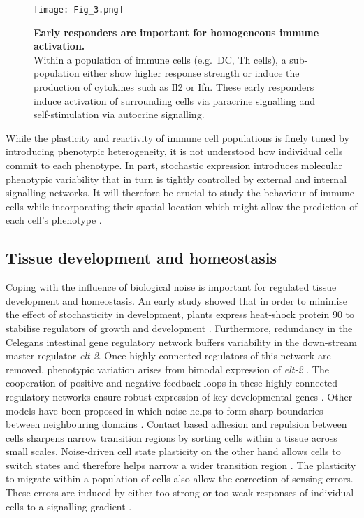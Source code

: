 \begin{figure}[!h]
\centering
\texttt{[image: Fig\_3.png]}
\caption[Early responders are important for homogeneous immune activation]{\textbf{Early responders are important for homogeneous immune activation.}\\
Within a population of immune cells (e.g.~\gls{DC}, \gls{Th} cells), a sub-population either show higher response strength or induce the production of cytokines such as \gls{Il}2 or \gls{Ifn}\textbeta. 
These early responders induce activation of surrounding cells via paracrine signalling and self-stimulation via autocrine signalling.}
\label{fig0:noise_immune}
\end{figure}

While the plasticity and reactivity of immune cell populations is finely tuned by introducing phenotypic heterogeneity, it is not understood how individual cells commit to each phenotype. 
In part, stochastic expression introduces molecular phenotypic variability that in turn is tightly controlled by external and internal signalling networks. 
It will therefore be crucial to study the behaviour of immune cells while incorporating their spatial location which might allow the prediction of each cell's phenotype \cite{Battich2015a}.

\subsection{Tissue development and homeostasis}

Coping with the influence of biological noise is important for regulated tissue development and homeostasis. 
An early study showed that in order to minimise the effect of stochasticity in development, plants express heat-shock protein 90 to stabilise regulators of growth and development \citep{Queitsch2002}. 
Furthermore, redundancy in the \Gls{Celegans} intestinal gene regulatory network buffers variability in the down-stream master regulator \textit{elt-2}. 
Once highly connected regulators of this network are removed, phenotypic variation arises from bimodal expression of \textit{elt-2} \citep{Raj2010}. 
The cooperation of positive and negative feedback loops in these highly connected regulatory networks ensure robust expression of key developmental genes \citep{Ji2013}. 
Other models have been proposed in which noise helps to form sharp boundaries between neighbouring domains \citep{Zhang2012}. 
Contact based adhesion and repulsion between cells sharpens narrow transition regions by sorting cells within a tissue across small scales. 
Noise-driven cell state plasticity on the other hand allows cells to switch states and therefore helps narrow a wider transition region \citep{Wang2017}. 
The plasticity to migrate within a population of cells also allow the correction of sensing errors. 
These errors are induced by either too strong or too weak responses of individual cells to a signalling gradient \citep{Camley2017}.

